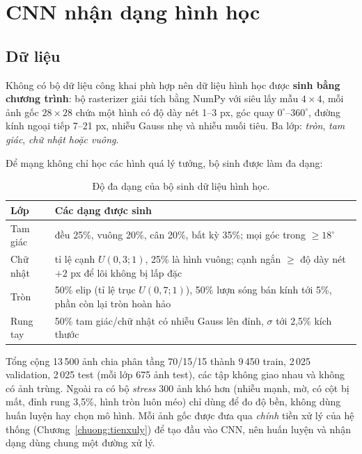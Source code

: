 \chapter{CNN nhận dạng hình học}
\label{chuong:hinhhoc}

\section{Dữ liệu}
Không có bộ dữ liệu công khai phù hợp nên dữ liệu hình học được \textbf{sinh bằng chương trình}: bộ rasterizer giải tích bằng NumPy với siêu lấy mẫu $4\times4$, mỗi ảnh gốc $28\times28$ chứa một hình có
độ dày nét 1--3 px, góc quay $0^{\circ}$--$360^{\circ}$, đường kính ngoại tiếp 7--21 px, nhiễu Gauss nhẹ và nhiễu muối tiêu. Ba lớp: \emph{tròn}, \emph{tam giác}, \emph{chữ nhật hoặc vuông}.

Để mạng không chỉ học các hình quá lý tưởng, bộ sinh được làm đa dạng:
\begin{table}[H]\centering
\begin{tabular}{lp{}}
\toprule
Lớp & Các dạng được sinh \\
\midrule
Tam giác & đều 25\%, vuông 20\%, cân 20\%, bất kỳ 35\%; mọi góc trong $\ge18^{\circ}$ \\
Chữ nhật & tỉ lệ cạnh $U(0{,}3;1)$, 25\% là hình vuông; cạnh ngắn $\ge$ độ dày nét $+2$ px để lõi không bị lấp đặc \\
Tròn & 50\% elip (tỉ lệ trục $U(0{,}7;1)$), 50\% lượn sóng bán kính tới 5\%, phần còn lại tròn hoàn hảo \\
Rung tay & 50\% tam giác/chữ nhật có nhiễu Gauss lên đỉnh, $\sigma$ tới 2,5\% kích thước \\
\bottomrule
\end{tabular}
\caption{Độ đa dạng của bộ sinh dữ liệu hình học.}
\end{table}

Tổng cộng 13\,500 ảnh chia phân tầng 70/15/15 thành 9\,450 train, 2\,025 validation, 2\,025 test (mỗi lớp 675 ảnh test), các tập không giao nhau và không có ảnh trùng.
Ngoài ra có bộ \emph{stress} 300 ảnh khó hơn (nhiễu mạnh, mờ, có cột bị mất, đỉnh rung 3{,}5\%, hình tròn luôn méo) chỉ dùng để đo độ bền, không dùng huấn luyện hay chọn mô hình.
Mỗi ảnh gốc được đưa qua \emph{chính} tiền xử lý của hệ thống (Chương~\ref{chuong:tienxuly}) để tạo đầu vào CNN, nên huấn luyện và nhận dạng dùng chung một đường xử lý.


